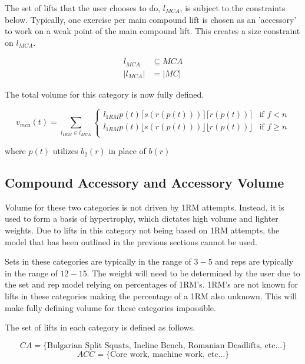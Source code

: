 The set of lifts that the user chooses to do, $l_{MCA}$, is subject to the constraints below. Typically, one exercise per main compound lift is chosen as an 'accessory' to work on a weak point of the main compound lift. This creates a size constraint on $l_{MCA}$.

\begin{equation}
    \begin{split}
        l_{MCA} & \subseteq MCA\\
        \left| l_{MCA} \right| & = \left| MC \right|
    \end{split}
\end{equation}

The total volume for this category is now fully defined.

\begin{equation}
    v_{mca}(t) = 
    \sum_{l_{1RM}\in l_{MCA}}
    \begin{cases}
        l_{1RM}p(t)\lceil s(r(p(t)))\rceil \lceil r(p(t))\rceil & \text{if $f<n$} \\
        l_{1RM}p(t)\lfloor s(r(p(t)))\rfloor \lfloor r(p(t))\rfloor & \text{if $f\ge n$} \\
    \end{cases} 
\end{equation}
\centerline{where $p(t)$ utilizes $b_2(r)$ in place of $b(r)$}

\subsection{Compound Accessory and Accessory Volume}
\label{sec:CompoundAccessoryVolume}
Volume for these two categories is not driven by 1RM attempts. Instead, it is used to form a basis of hypertrophy, which dictates high volume and lighter weights. Due to lifts in this category not being based on 1RM attempts, the model that has been outlined in the previous sections cannot be used.

Sets in these categories are typically in the range of $3-5$ and reps are typically in the range of $12-15$. The weight will need to be determined by the user due to the set and rep model relying on percentages of 1RM's. 1RM's are not known for lifts in these categories making the percentage of a 1RM also unknown. This will make fully defining volume for these categories impossible.

The set of lifts in each category is defined as follows.

\begin{equation}
    CA=\{\text{Bulgarian Split Squats, Incline Bench, Romanian Deadlifts, etc}\dots\}
\end{equation}
\begin{equation}
    ACC=\{\text{Core work, machine work, etc}\dots\}
\end{equation}

